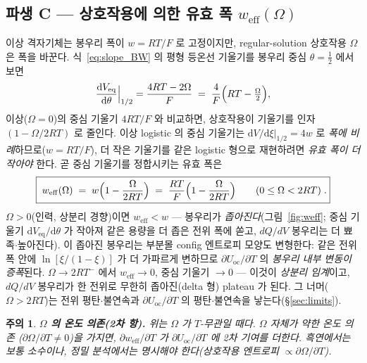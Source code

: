 \documentclass[11pt,a4paper]{article}
\newtheorem*{warnbox}{주의}
\newcommand{\dd}{\mathrm{d}}
\newcommand{\eq}{\mathrm{eq}}
\newcommand{\oc}{\mathrm{oc}}
\newcommand{\eff}{\mathrm{eff}}
\begin{document}
\subsection{파생 C — 상호작용에 의한 유효 폭 $w_\eff(\Omega)$}\label{ssec:weff}
이상 격자기체는 봉우리 폭이 $w=RT/F$ 로 고정이지만, regular-solution 상호작용 $\Omega$ 은 폭을 바꾼다.
식~\eqref{eq:slope_BW} 의 평형 등온선 기울기를 봉우리 중심 $\theta=\tfrac12$ 에서 보면
\begin{equation}
\frac{\dd V_\eq}{\dd\theta}\Big|_{1/2}=\frac{4RT-2\Omega}{F}
\;=\;\frac{4}{F}\Bigl(RT-\tfrac{\Omega}{2}\Bigr),
\label{eq:slope_half}
\end{equation}
이상($\Omega=0$)의 중심 기울기 $4RT/F$ 와 비교하면, 상호작용이 기울기를 인자 $(1-\Omega/2RT)$ 로 줄인다.
이상 logistic 의 중심 기울기는 $\dd V/\dd\xi|_{1/2}=4w$ 로 \emph{폭에 비례}하므로($w=RT/F$), 더 작은
기울기를 같은 logistic 형으로 재현하려면 \emph{유효 폭이 더 작아야} 한다. 곧 중심 기울기를 정합시키는
유효 폭은
\begin{equation}
\boxed{\;w_\eff(\Omega)\;=\;w\Bigl(1-\frac{\Omega}{2RT}\Bigr)\;=\;\frac{RT}{F}\Bigl(1-\frac{\Omega}{2RT}\Bigr)\qquad(0\le\Omega<2RT)\;.}
\label{eq:weff}
\end{equation}
$\Omega>0$(인력, 상분리 경향)이면 $w_\eff<w$ — 봉우리가 \emph{좁아진다}(그림~\ref{fig:weff}; 중심 기울기 $\dd V_\eq/\dd\theta$ 가
작아져 같은 용량을 더 좁은 전위 폭에 쏟고, $dQ/dV$ 봉우리는 더 뾰족$\cdot$높아진다). 이 좁아진 봉우리는 부분몰
config 엔트로피 모양도 변형한다: 같은 전위 폭 안에 $\ln[\xi/(1-\xi)]$ 가 더 가파르게 변하므로 $\partial U_\oc/\partial T$
의 \emph{봉우리 내부 변동이 증폭}된다. $\Omega\to2RT^-$ 에서 $w_\eff\to0$, 중심 기울기 $\to0$ — 이것이 \emph{상분리
임계}이고, $dQ/dV$ 봉우리가 한 전위로 무한히 좁아진(delta 형) plateau 가 된다. 그 너머($\Omega>2RT$)는 전위
평탄$\cdot$불연속과 $\partial U_\oc/\partial T$ 의 평탄$\cdot$불연속을 낳는다(\S\ref{sec:limits}).
\begin{warnbox}
\textbf{$\Omega$ 의 온도 의존(2차 항).} 위는 $\Omega$ 가 $T$-무관일 때다. $\Omega$ 자체가 약한 온도 의존
($\partial\Omega/\partial T\ne0$)을 가지면, $\partial w_\eff/\partial T$ 가 $\partial U_\oc/\partial T$ 에 2차
기여를 더한다. 흑연에서는 보통 소수이나, 정밀 분석에서는 명시해야 한다(상호작용 엔트로피 $\propto\partial\Omega/\partial T$).
\end{warnbox}
\end{document}
